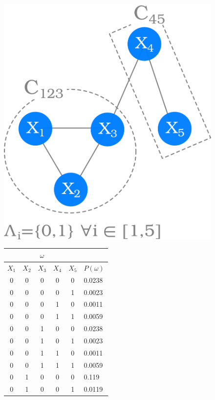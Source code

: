 \begin{figure}
\center
\begin{minipage}{0.3\textwidth}
\includegraphics[scale=0.10]{figures/chapter3/mrf-example.png}
\end{minipage}%
\begin{minipage}{0.35\textwidth}
\tiny
\begin{tabular}{|c|c|c|c|c|l|}
\hline
\multicolumn{5}{|c|}{$\omega$} & \\
\hline
$X_1$ & $X_2$ & $X_3$ & $X_4$ & $X_5$ & $P(\omega)$\\
\hline
0 & 0 & 0 & 0 & 0 & 0.0238 \\
0 & 0 & 0 & 0 & 1 & 0.0023 \\
0 & 0 & 0 & 1 & 0 & 0.0011 \\
0 & 0 & 0 & 1 & 1 & 0.0059 \\
0 & 0 & 1 & 0 & 0 & 0.0238 \\
0 & 0 & 1 & 0 & 1 & 0.0023 \\
0 & 0 & 1 & 1 & 0 & 0.0011 \\
0 & 0 & 1 & 1 & 1 & 0.0059 \\
0 & 1 & 0 & 0 & 0 & 0.119 \\
0 & 1 & 0 & 0 & 1 & 0.0119 \\

\end{tabular}
\end{minipage}
\end{figure}
